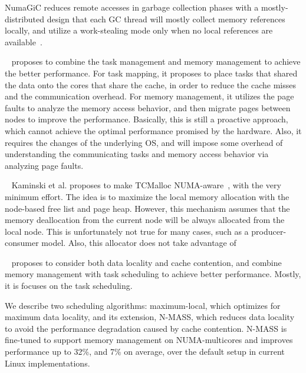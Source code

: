 NumaGiC reduces remote accesses in garbage collection phases with a mostly-distributed design that each GC thread will mostly collect memory references locally, and utilize a work-stealing mode only when no local references are available~\cite{NumaGiC}.  


~\cite{diener2015automatic} proposes to combine the task management and memory management to achieve the better performance. For task mapping, it proposes to place tasks that shared the data onto the cores that share the cache, in order to reduce the cache misses and the communication overhead. For memory management, it utilizes the page faults to analyze the memory access behavior, and then migrate pages between nodes to improve the performance. Basically, this is still a proactive approach, which cannot achieve the optimal performance promised by the hardware. Also, it requires the changes of the underlying OS, and will impose some overhead of understanding the communicating tasks and memory access behavior via analyzing page faults.  

 
~\cite{1419934}
Kaminski et al. proposes to make TCMalloc NUMA-aware~\cite{tcmallocnew}, with the very minimum effort. The idea is to maximize the local memory allocation with the node-based free list and page heap. However, this mechanism assumes that the memory deallocation from the current node will be always allocated from the local node. This is unfortunately not true for many cases, such as a producer-consumer model. Also, this allocator does not take advantage of 

~\cite{Majo:2011:MMN:1993478.1993481} proposes to consider both data locality and cache contention, and combine memory management with task scheduling to achieve better performance. Mostly, it is focuses on the task scheduling. 
 
We describe two scheduling algorithms: maximum-local, which optimizes for maximum data locality, and its extension, N-MASS, which reduces data locality to avoid the performance degradation caused by cache contention. N-MASS is fine-tuned to support memory management on NUMA-multicores and improves performance up to 32\%, and 7\% on average, over the default setup in current Linux implementations.


